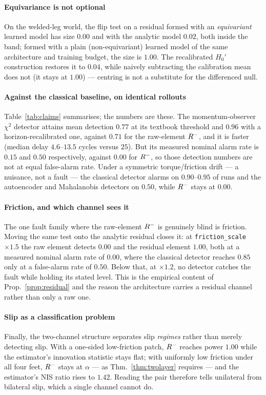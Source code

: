 \paragraph{Equivariance is not optional}
On the welded-leg world, the flip test on a residual formed with an \emph{equivariant} learned model has size $0.00$ and
with the analytic model $0.02$, both inside the band; formed with a plain (non-equivariant) learned model of the same
architecture and training budget, the size is $1.00$. The recalibrated $H_0'$ construction restores it to $0.04$, while
naively subtracting the calibration mean does not (it stays at $1.00$) --- centring is not a substitute for the
differenced null.

\paragraph{Against the classical baseline, on identical rollouts}
Table~\ref{tab:claims} summarises; the numbers are these. The momentum-observer $\chi^2$ detector attains mean detection
$0.77$ at its textbook threshold and $0.96$ with a horizon-recalibrated one, against $0.71$ for the raw-element
$R^{-}$, and it is faster (median delay $4.6$--$13.5$ cycles versus $25$). But its measured nominal alarm rate is
$0.15$ and $0.50$ respectively, against $0.00$ for $R^{-}$, so those detection numbers are not at equal false-alarm
rate. Under a symmetric torque/friction drift --- a nuisance, not a fault --- the classical detector alarms on
$0.90$--$0.95$ of runs and the autoencoder and Mahalanobis detectors on $0.50$, while $R^{-}$ stays at $0.00$.

\paragraph{Friction, and which channel sees it}
The one fault family where the raw-element $R^{-}$ is genuinely blind is friction. Moving the same test onto the
analytic residual closes it: at \texttt{friction\_scale} $\times1.5$ the raw element detects $0.00$ and the residual
element $1.00$, both at a measured nominal alarm rate of $0.00$, where the classical detector reaches $0.85$ only at a
false-alarm rate of $0.50$. Below that, at $\times1.2$, no detector catches the fault while holding its stated level.
This is the empirical content of Prop.~\ref{prop:residual} and the reason the architecture carries a residual channel
rather than only a raw one.

\paragraph{Slip as a classification problem}
Finally, the two-channel structure separates slip \emph{regimes} rather than merely detecting slip. With a one-sided
low-friction patch, $R^{-}$ reaches power $1.00$ while the estimator's innovation statistic stays flat; with uniformly
low friction under all four feet, $R^{-}$ stays at $\alpha$ --- as Thm.~\ref{thm:twolayer} requires --- and the
estimator's NIS ratio rises to $1.42$. Reading the pair therefore tells unilateral from bilateral slip, which a single
channel cannot do.
